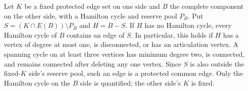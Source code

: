 Let $K$ be a fixed protected edge set on one side and $B$ the complete
component on the other side, with a Hamilton cycle and reserve pool $P_B$.
Put $S=(K\cap E(B))\setminus P_B$ and $H=B-S$. If $H$ has no Hamilton
cycle, every Hamilton cycle of $B$ contains an edge of $S$. In particular,
this holds if $H$ has a vertex of degree at most one, is disconnected,
or has an articulation vertex. A spanning cycle on at least three vertices
has minimum degree two, is connected, and remains connected after deleting
any one vertex. Since $S$ is also outside the fixed-$K$ side's reserve
pool, such an edge is a protected common edge. Only the Hamilton cycle
on the $B$ side is quantified; the other side's $K$ is fixed.
